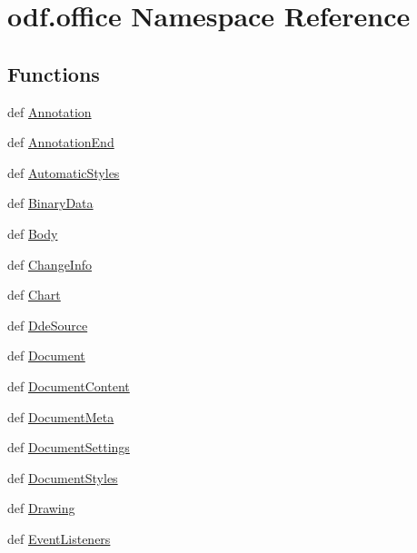\hypertarget{namespaceodf_1_1office}{\section{odf.\+office Namespace Reference}
\label{namespaceodf_1_1office}
}
\subsection*{Functions}
\begin{DoxyCompactItemize}
\item 
def \hyperlink{namespaceodf_1_1office_a04497efb1d2eb04f1160a785801bd1ea}{Annotation}
\item 
def \hyperlink{namespaceodf_1_1office_a03f599b1065c597dccff9a79d841e8f2}{Annotation\+End}
\item 
def \hyperlink{namespaceodf_1_1office_abcd765298646e8cd782dbca186afe6b5}{Automatic\+Styles}
\item 
def \hyperlink{namespaceodf_1_1office_a1ffd116c8222f628c1aa249849be0ea1}{Binary\+Data}
\item 
def \hyperlink{namespaceodf_1_1office_af99bd1bdb6e0c44e5844977632ae767f}{Body}
\item 
def \hyperlink{namespaceodf_1_1office_a245fa42c280a2ddbcc5ab656cb6587bb}{Change\+Info}
\item 
def \hyperlink{namespaceodf_1_1office_af0b1c3c239d01f008cb2c6d4fc3240fb}{Chart}
\item 
def \hyperlink{namespaceodf_1_1office_ae9e3a5e7827329874bb5983127e5e97e}{Dde\+Source}
\item 
def \hyperlink{namespaceodf_1_1office_a8911e083995dcd8e4e79e9b3859df146}{Document}
\item 
def \hyperlink{namespaceodf_1_1office_a55094c9d071beb272023c7bddff88a03}{Document\+Content}
\item 
def \hyperlink{namespaceodf_1_1office_a897ebe1e7d3d9d00bf294b3ff0e827bd}{Document\+Meta}
\item 
def \hyperlink{namespaceodf_1_1office_a024d9cff5f35af20e1b2619fcc4ef797}{Document\+Settings}
\item 
def \hyperlink{namespaceodf_1_1office_abebbacc9a8bcd23644f3dc2ac7ff8129}{Document\+Styles}
\item 
def \hyperlink{namespaceodf_1_1office_a4243dc5ed97e8dd14f28f466710f67f3}{Drawing}
\item 
def \hyperlink{namespaceodf_1_1office_af4ef9b9abd30debca5bde6998c52df38}{Event\+Listeners}
\item 

\end{DoxyCompactItemize}
